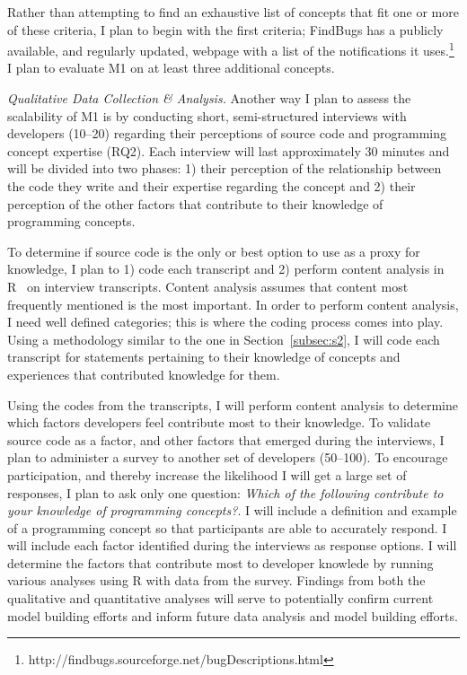 \documentclass{llncs}
\begin{document}
Rather than attempting to find an exhaustive list of concepts that fit one or more of these criteria, I plan to begin with the first criteria; FindBugs has a publicly available, and regularly updated, webpage with a list of the notifications it uses.\footnote{http://findbugs.sourceforge.net/bugDescriptions.html}
I plan to evaluate M1 on at least three additional concepts.

\vspace{0.5em}

\noindent\textit{Qualitative Data Collection \& Analysis.}
Another way I plan to assess the scalability of M1 is by conducting short, semi-structured interviews with developers (10--20) regarding their perceptions of source code and programming concept expertise (RQ2). Each interview will last approximately 30 minutes and will be divided into two phases: 1) their perception of the relationship between the code they write and their expertise regarding the concept and 2) their perception of the other factors that contribute to their knowledge of programming concepts.  

To determine if source code is the only or best option to use as a proxy for knowledge, I plan to 1) code each transcript and 2) perform content analysis in R~\cite{RSoftware} on interview transcripts. Content analysis assumes that content most frequently mentioned is the most important. In order to perform content analysis, I need well defined categories; this is where the coding process comes into play. Using a methodology similar to the one in Section~\ref{subsec:s2}, I will code each transcript for statements pertaining to their knowledge of concepts and experiences that contributed knowledge for them. 

Using the codes from the transcripts, I will perform content analysis to determine which factors developers feel contribute most to their knowledge.
To validate source code as a factor, and other factors that emerged during the interviews, I plan to administer a survey to another set of developers (50--100). To encourage participation, and thereby increase the likelihood I will get a large set of responses, I plan to ask only one question: \emph{Which of the following contribute to your knowledge of programming concepts?}. I will include a definition and example of a programming concept so that participants are able to accurately respond. I will include each factor identified during the interviews as response options.
I will determine the factors that contribute most to developer knowlede by running various analyses using R with data from the survey. Findings from both the qualitative and quantitative analyses will serve to potentially confirm current model building efforts and inform future data analysis and model building efforts.
\end{document}
